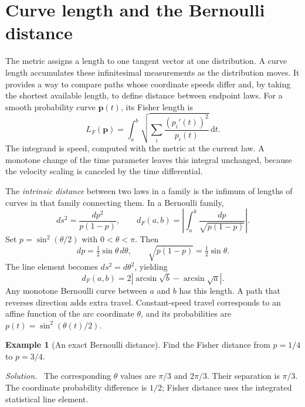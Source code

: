 \documentclass[11pt,oneside,openany]{book}
\theoremstyle{definition}
\newtheorem{example}{Example}[chapter]
\theoremstyle{remark}
\newenvironment{solution}{\par\smallskip\noindent\textit{Solution.}\ }{\par\smallskip}
\newcommand{\dd}{\,\mathrm{d}}
\newcommand{\p}{\mathbf{p}}
\numberwithin{equation}{chapter}
\begin{document}
\section{Curve length and the Bernoulli distance}
The metric assigns a length to one tangent vector at one distribution. A curve length accumulates these infinitesimal measurements as the distribution moves. It provides a way to compare paths whose coordinate speeds differ and, by taking the shortest available length, to define distance between endpoint laws.
For a smooth probability curve $\p(t)$, its Fisher length is
\begin{equation}\label{eq:fisherlength}
L_F(\p)=\int_a^b\sqrt{\sum_i\frac{(p_i'(t))^2}{p_i(t)}}\dd t.
\end{equation}
The integrand is speed, computed with the metric at the current law. A monotone change of the time parameter leaves this integral unchanged, because the velocity scaling is canceled by the time differential.

The \emph{intrinsic distance} between two laws in a family is the infimum of lengths of curves in that family connecting them. In a Bernoulli family,
\[
ds^2=\frac{dp^2}{p(1-p)},\qquad
d_F(a,b)=\left|\int_a^b\frac{dp}{\sqrt{p(1-p)}}\right|.
\]
Set $p=\sin^2(\theta/2)$ with $0<\theta<\pi$. Then
\[
dp=\tfrac12\sin\theta\,d\theta,
\qquad \sqrt{p(1-p)}=\tfrac12\sin\theta.
\]
The line element becomes $ds^2=d\theta^2$, yielding
\begin{equation}\label{eq:bernoullidistance}
\boxed{d_F(a,b)=2\left|\arcsin\sqrt b-\arcsin\sqrt a\right|.}
\end{equation}
Any monotone Bernoulli curve between $a$ and $b$ has this length. A path that reverses direction adds extra travel. Constant-speed travel corresponds to an affine function of the arc coordinate $\theta$, and its probabilities are $p(t)=\sin^2(\theta(t)/2)$.

\begin{example}[An exact Bernoulli distance]
Find the Fisher distance from $p=1/4$ to $p=3/4$.
\begin{solution}
The corresponding $\theta$ values are $\pi/3$ and $2\pi/3$. Their separation is $\pi/3$. The coordinate probability difference is $1/2$; Fisher distance uses the integrated statistical line element.
\end{solution}
\end{example}
\end{document}
